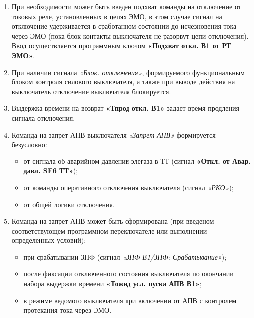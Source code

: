 \begin{enumerate}
\item
При необходимости может быть введен подхват команды на отключение от токовых реле, установленных в цепях ЭМО, в этом случае сигнал на отключение удерживается в сработанном состоянии до исчезновения тока через ЭМО (пока блок-контакты выключателя не разорвут цепи отключения). Ввод осуществляется программным ключом \textbf{«Подхват откл. В1 от РТ ЭМО»}.

\item
При наличии сигнала \textit{«Блок. отключения»}, формируемого функциональным блоком контроля силового выключателя, а также при выводе действия на выключатель отключение выключателя блокируется.

\item
Выдержка времени на возврат \textbf{«Тпрод откл. В1»} задает время продления сигнала отключения. 

\item
Команда на запрет АПВ выключателя \textit{«Запрет АПВ»} формируется безусловно:
\begin{itemize}
    \item от сигнала об аварийном давлении элегаза в ТТ (сигнал \textbf{«Откл. от Авар. давл. SF6 ТТ»});
    \item от команды оперативного отключения выключателя (сигнал \textit{«РКО»});
    \item от общей логики отключения.
\end{itemize}

\item
Команда на запрет АПВ может быть сформирована (при введеном соответствующем программном переключателе или выполнении определенных условий):
\begin{itemize}
    \item при срабатывании ЗНФ (сигнал \textit{«ЗНФ В1/ЗНФ: Срабатывание»});
    \item после фиксации отключенного состояния выключателя по окончании набора выдержки времени \textbf{«Тожид усл. пуска АПВ В1»};
    \item в режиме ведомого выключателя при включении от АПВ с контролем протекания тока через ЭМО.
\end{itemize}


\end{enumerate}